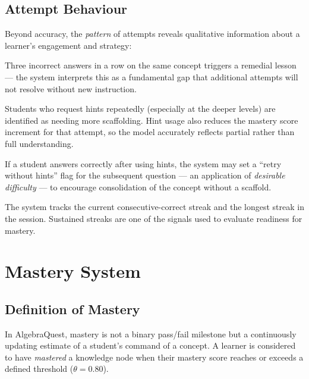 \documentclass[12pt,a4paper]{article}
\begin{document}
\subsection{Attempt Behaviour}

Beyond accuracy, the \emph{pattern} of attempts reveals qualitative
information about a learner's engagement and strategy:

\begin{description}[leftmargin=2em, style=nextline]
  \item[\textbf{Consecutive incorrect answers}]
    Three incorrect answers in a row on the same concept triggers a remedial
    lesson — the system interprets this as a fundamental gap that additional
    attempts will not resolve without new instruction.

  \item[\textbf{Hint-seeking behaviour}]
    Students who request hints repeatedly (especially at the deeper levels)
    are identified as needing more scaffolding.  Hint usage also reduces the
    mastery score increment for that attempt, so the model accurately reflects
    partial rather than full understanding.

  \item[\textbf{Post-hint performance}]
    If a student answers correctly after using hints, the system may set a
    ``retry without hints'' flag for the subsequent question — an application
    of \emph{desirable difficulty} — to encourage consolidation of the concept
    without a scaffold.

  \item[\textbf{Streaks}]
    The system tracks the current consecutive-correct streak and the longest
    streak in the session.  Sustained streaks are one of the signals used to
    evaluate readiness for mastery.
\end{description}

\section{Mastery System}

\subsection{Definition of Mastery}

In AlgebraQuest, mastery is not a binary pass/fail milestone but a
continuously updating estimate of a student's command of a concept.  A
learner is considered to have \emph{mastered} a knowledge node when their
mastery score reaches or exceeds a defined threshold ($\theta = 0.80$).
\end{document}
